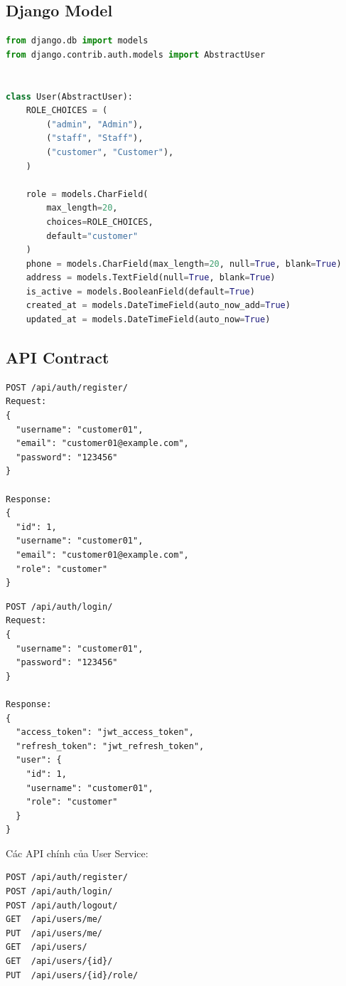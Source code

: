 \subsection{Django Model}

\begin{lstlisting}[style=code,language=Python]
from django.db import models
from django.contrib.auth.models import AbstractUser


class User(AbstractUser):
    ROLE_CHOICES = (
        ("admin", "Admin"),
        ("staff", "Staff"),
        ("customer", "Customer"),
    )

    role = models.CharField(
        max_length=20,
        choices=ROLE_CHOICES,
        default="customer"
    )
    phone = models.CharField(max_length=20, null=True, blank=True)
    address = models.TextField(null=True, blank=True)
    is_active = models.BooleanField(default=True)
    created_at = models.DateTimeField(auto_now_add=True)
    updated_at = models.DateTimeField(auto_now=True)
\end{lstlisting}

\subsection{API Contract}

\begin{lstlisting}[style=code]
POST /api/auth/register/
Request:
{
  "username": "customer01",
  "email": "customer01@example.com",
  "password": "123456"
}

Response:
{
  "id": 1,
  "username": "customer01",
  "email": "customer01@example.com",
  "role": "customer"
}
\end{lstlisting}

\begin{lstlisting}[style=code]
POST /api/auth/login/
Request:
{
  "username": "customer01",
  "password": "123456"
}

Response:
{
  "access_token": "jwt_access_token",
  "refresh_token": "jwt_refresh_token",
  "user": {
    "id": 1,
    "username": "customer01",
    "role": "customer"
  }
}
\end{lstlisting}

Các API chính của User Service:

\begin{lstlisting}[style=code]
POST /api/auth/register/
POST /api/auth/login/
POST /api/auth/logout/
GET  /api/users/me/
PUT  /api/users/me/
GET  /api/users/
GET  /api/users/{id}/
PUT  /api/users/{id}/role/
\end{lstlisting}

